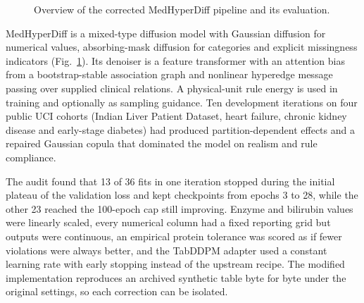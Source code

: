 \documentclass[conference]{IEEEtran}
\begin{document}
\begin{figure}[t]
\centering
{}
\caption{Overview of the corrected MedHyperDiff pipeline and its evaluation.}
\label{fig:pipeline}
\end{figure}

MedHyperDiff is a mixed-type diffusion model with Gaussian diffusion for numerical values, absorbing-mask diffusion for categories and explicit missingness indicators (Fig.~\ref{fig:pipeline}). Its denoiser is a feature transformer with an attention bias from a bootstrap-stable association graph and nonlinear hyperedge message passing over supplied clinical relations. A physical-unit rule energy is used in training and optionally as sampling guidance. Ten development iterations on four public UCI cohorts (Indian Liver Patient Dataset, heart failure, chronic kidney disease and early-stage diabetes) had produced partition-dependent effects and a repaired Gaussian copula that dominated the model on realism and rule compliance.

The audit found that 13 of 36 fits in one iteration stopped during the initial plateau of the validation loss and kept checkpoints from epochs 3 to 28, while the other 23 reached the 100-epoch cap still improving. Enzyme and bilirubin values were linearly scaled, every numerical column had a fixed reporting grid but outputs were continuous, an empirical protein tolerance was scored as if fewer violations were always better, and the TabDDPM adapter used a constant learning rate with early stopping instead of the upstream recipe. The modified implementation reproduces an archived synthetic table byte for byte under the original settings, so each correction can be isolated.
\end{document}
